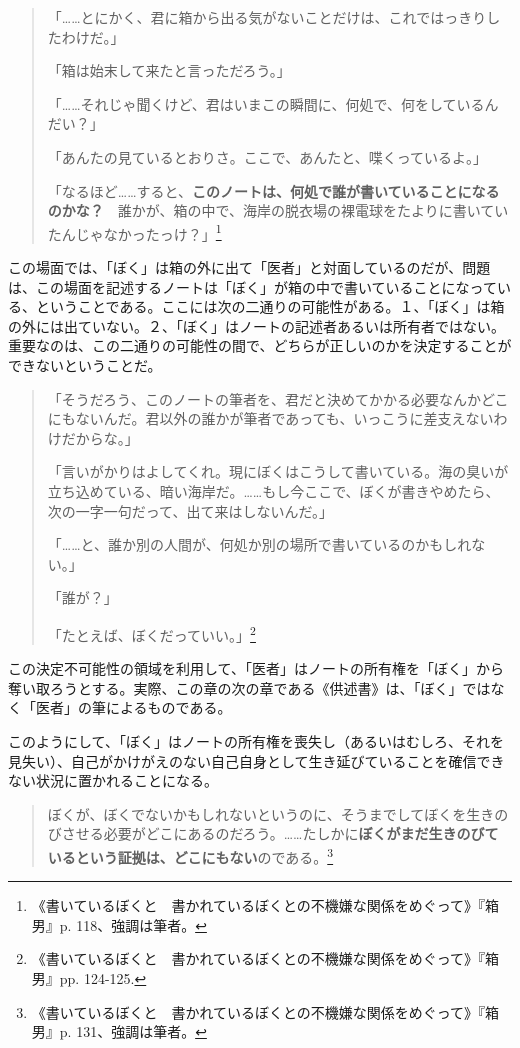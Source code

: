 \documentclass[a4paper]{jsarticle}
\begin{document}
\begin{quotation}
「……とにかく、君に箱から出る気がないことだけは、これではっきりしたわけだ。」
	
「箱は始末して来たと言っただろう。」
	
「……それじゃ聞くけど、君はいまこの瞬間に、何処で、何をしているんだい？」
	
「あんたの見ているとおりさ。ここで、あんたと、喋くっているよ。」
	
「なるほど……すると、\textbf{このノートは、何処で誰が書いていることになるのかな？}　誰かが、箱の中で、海岸の脱衣場の裸電球をたよりに書いていたんじゃなかったっけ？」\footnote{《書いているぼくと　書かれているぼくとの不機嫌な関係をめぐって》『箱男』p. 118、強調は筆者。}	
\end{quotation}

この場面では、「ぼく」は箱の外に出て「医者」と対面しているのだが、問題は、この場面を記述するノートは「ぼく」が箱の中で書いていることになっている、ということである。ここには次の二通りの可能性がある。１、「ぼく」は箱の外には出ていない。２、「ぼく」はノートの記述者あるいは所有者ではない。重要なのは、この二通りの可能性の間で、どちらが正しいのかを決定することができないということだ。

\begin{quotation}
「そうだろう、このノートの筆者を、君だと決めてかかる必要なんかどこにもないんだ。君以外の誰かが筆者であっても、いっこうに差支えないわけだからな。」

「言いがかりはよしてくれ。現にぼくはこうして書いている。海の臭いが立ち込めている、暗い海岸だ。……もし今ここで、ぼくが書きやめたら、次の一字一句だって、出て来はしないんだ。」

「……と、誰か別の人間が、何処か別の場所で書いているのかもしれない。」

「誰が？」

「たとえば、ぼくだっていい。」\footnote{《書いているぼくと　書かれているぼくとの不機嫌な関係をめぐって》『箱男』pp. 124-125.}
\end{quotation}

この決定不可能性の領域を利用して、「医者」はノートの所有権を「ぼく」から奪い取ろうとする。実際、この章の次の章である《供述書》は、「ぼく」ではなく「医者」の筆によるものである。

このようにして、「ぼく」はノートの所有権を喪失し（あるいはむしろ、それを見失い）、自己がかけがえのない自己自身として生き延びていることを確信できない状況に置かれることになる。

\begin{quotation}
ぼくが、ぼくでないかもしれないというのに、そうまでしてぼくを生きのびさせる必要がどこにあるのだろう。……たしかに\textbf{ぼくがまだ生きのびているという証拠は、どこにもない}のである。\footnote{《書いているぼくと　書かれているぼくとの不機嫌な関係をめぐって》『箱男』p. 131、強調は筆者。}
\end{quotation}
\end{document}
